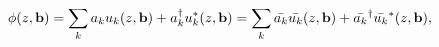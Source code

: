 \begin{equation} \label{phi expansion}
\phi(z,{\bf b})= \sum_k a_k u_k (z,{\bf b}) + a_k ^\dagger u_k ^* (z,{\bf b}) = \sum_k \bar{a_k} \bar{u_k} (z,{\bf b}) +\bar{a_k}^\dagger
\bar{u_k} ^* (z,{\bf b}) ,
\end{equation}


